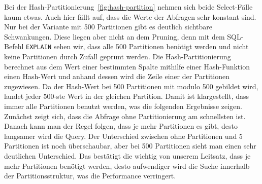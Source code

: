 Bei der Hash-Partitionierung~\ref{fig:hash-partition} nehmen sich beide Select-Fälle kaum etwas.
Auch hier fällt auf, dass die Werte der Abfragen sehr konstant sind.
Nur bei der Variante mit 500 Partitionen gibt es deutlich sichtbare Schwankungen.
Diese liegen aber nicht an dem Pruning, denn mit dem SQL-Befehl \texttt{EXPLAIN} sehen wir, dass alle 500 Partitionen benötigt werden und nicht keine Partitionen durch Zufall geprunt werden.
Die Hash-Partitionierung berechnet aus dem Wert einer bestimmten Spalte mithilfe einer Hash-Funktion einen Hash-Wert und anhand dessen wird die Zeile einer der Partitionen zugewiesen.
Da der Hash-Wert bei 500 Partitionen mit modulo 500 gebildet wird, landet jeder 500-ste Wert in der gleichen Partition.
Damit ist klargestellt, dass immer alle Partitionen benutzt werden, was die folgenden Ergebnisse zeigen.
Zunächst zeigt sich, dass die Abfrage ohne Partitionierung am schnellsten ist.
Danach kann man der Regel folgen, dass je mehr Partitionen es gibt, desto langsamer wird die Query.
Der Unterschied zwischen ohne Partitionen und 5 Partitionen ist noch überschaubar, aber bei 500 Partitionen sieht man einen sehr deutlichen Unterschied.
Das bestätigt die wichtig von unserem Leitsatz, dass je mehr Partitionen benötigt werden, desto aufwendiger wird die Suche innerhalb der Partitionsstruktur, was die Performance verringert.

